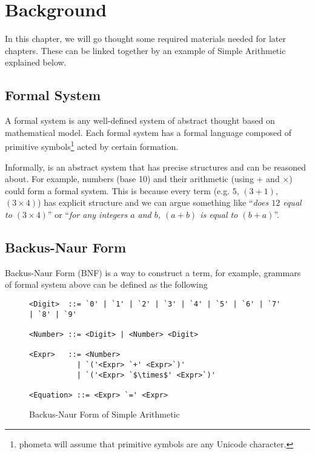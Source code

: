 \documentclass[master.tex]{subfiles}
\begin{document}
\chapter{Background}
\label{chap:background}

In this chapter, we will go thought some required materials needed for later
chapters. These can be linked together by an example of Simple Arithmetic
explained below.

\hspace{1ex}

\section{Formal System}

A formal system is any well-defined system of abstract thought based on
mathematical model\supercite{formal-system-wiki}. Each formal system has a
formal language composed of primitive symbols\footnote{phometa will assume that
  primitive symbols are any Unicode character.} acted by certain
formation\supercite{formal-system-britannica}.

Informally, is an abstract system that has precise structures and can be
reasoned about. For example, numbers (base 10) and their arithmetic (using $+$
and $\times$) could form a formal system. This is because every term (e.g. $5$,
$(3 + 1)$, $(3 \times 4)$) has explicit structure and we can argue something
like ``\emph{does $12$ equal to $(3 \times 4)$}'' or ``\emph{for any integers
  $a$ and $b$, $(a + b)$ is equal to $(b + a)$}''.

\hspace{1ex}

\section{Backus-Naur Form}

Backus-Naur Form (BNF) is a way to construct a term, for example, grammars of
formal system above can be defined as the following

\hspace{1ex}

\begin{figure}[H]
\begin{framed}
\begin{lstlisting}[style=bnf]
<Digit>  ::= `0' | `1' | `2' | `3' | `4' | `5' | `6' | `7' | `8' | `9'

<Number> ::= <Digit> | <Number> <Digit>

<Expr>   ::= <Number>
           | `('<Expr> `+' <Expr>`)'
           | `('<Expr> `$\times$' <Expr>`)'

<Equation> ::= <Expr> `=' <Expr>
\end{lstlisting}
\end{framed}
\caption{Backus-Naur Form of Simple Arithmetic}
\label{fig:background-bnf}
\end{figure}
\end{document}
